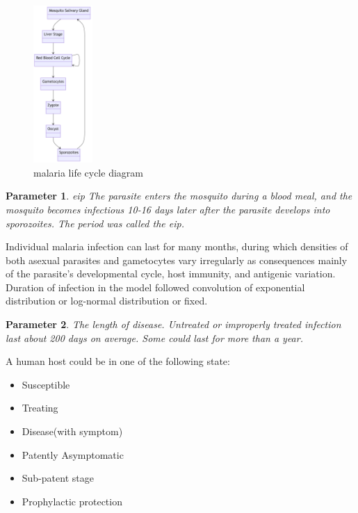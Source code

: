 \documentclass[a4paper, 12pt, twoside]{article}
\newtheorem{parameter}{Parameter}
\begin{document}
\begin{figure}[htpb]
	\centering
	\includegraphics[width=0.2\textwidth]{malaria-life-cycle-diagram}
	\caption{malaria life cycle diagram}
	\label{fig:malaria-life-cycle-diagram}
\end{figure}

\begin{parameter}{\gls{eip}}
	The parasite enters the mosquito during a blood meal, and the mosquito becomes infectious 10-16 days later after the parasite develops into sporozoites.
	The period was called the \gls{eip}.
\end{parameter}

Individual malaria infection can last for many months, during which densities of both asexual parasites and gametocytes vary irregularly as consequences mainly of the parasite's developmental cycle, host immunity, and antigenic variation.
Duration of infection in the model followed convolution of exponential distribution or log-normal distribution or fixed.

\begin{parameter}
	{The length of disease.}
	{Untreated or improperly treated infection last about 200 days on average.
  Some could last for more than a year.}
\end{parameter}

A human host could be in one of the following state:
\begin{itemize}
	\item Susceptible
	\item Treating
	\item Disease(with symptom)
	\item Patently Asymptomatic
	\item Sub-patent stage
	\item Prophylactic protection
\end{itemize}
\end{document}
